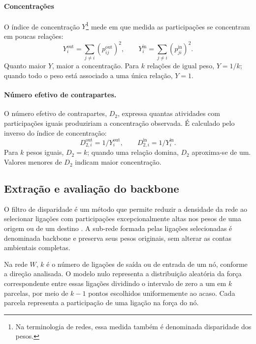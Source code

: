 \paragraph{Concentrações}
O índice de concentração $Y$\footnote{Na terminologia de redes, essa medida também é denominada disparidade dos pesos.} mede em que medida as participações se concentram em poucas relações:
\begin{equation}
Y_i^{\mathrm{out}}=\sum_{j\ne i}(p_{ij}^{\mathrm{out}})^2,\qquad
Y_i^{\mathrm{in}}=\sum_{j\ne i}(p_{ji}^{\mathrm{in}})^2.
\label{eq:disparidade}
\end{equation}
Quanto maior $Y$, maior a concentração. Para $k$ relações de igual peso, $Y=1/k$; quando todo o peso está associado a uma única relação, $Y=1$.

\paragraph{Número efetivo de contrapartes.}
O número efetivo de contrapartes, $D_2$, expressa quantas atividades com participações iguais produziriam a concentração observada. É calculado pelo inverso do índice de concentração:
\[
D_{2,i}^{\mathrm{out}}=1/Y_i^{\mathrm{out}},\qquad
D_{2,i}^{\mathrm{in}}=1/Y_i^{\mathrm{in}}.
\]
Para $k$ pesos iguais, $D_2=k$; quando uma relação domina, $D_2$ aproxima-se de um. Valores menores de $D_2$ indicam maior concentração. 

\subsection{Extração e avaliação do backbone}
\label{sec:backbone}

O filtro de disparidade é um método que permite reduzir a densidade da rede ao selecionar ligações com participações excepcionalmente altas nos pesos de uma origem ou de um destino \parencite{serrano2009,huang2019}. A sub-rede formada pelas ligações selecionadas é denominada backbone e preserva seus pesos originais, sem alterar as contas ambientais completas.

Na rede $W$, $k$ é o número de ligações de saída ou de entrada de um nó, conforme a direção analisada. O modelo nulo representa a distribuição aleatória da força correspondente entre essas ligações dividindo o intervalo de zero a um em $k$ parcelas, por meio de $k-1$ pontos escolhidos uniformemente ao acaso. Cada parcela representa a participação de uma ligação na força do nó.

